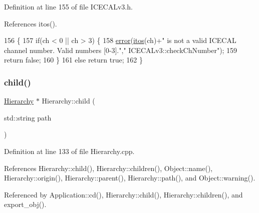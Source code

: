 Definition at line 155 of file I\+C\+E\+C\+A\+Lv3.\+h.



References itos().


\begin{DoxyCode}
156     \{
157         \textcolor{keywordflow}{if}(ch < 0 || ch > 3) \{
158             \hyperlink{classObject_a204a95f57818c0f811933917a30eff45}{error}(\hyperlink{Tools_8h_af330027dbdafb9a30768b3613c553e60}{itos}(ch)+\textcolor{stringliteral}{" is not a valid ICECAL channel number. Valid numbers [0-3]."},\textcolor{stringliteral}{"
      ICECALv3::checkChNumber"});
159             \textcolor{keywordflow}{return} \textcolor{keyword}{false};
160         \}
161         \textcolor{keywordflow}{else} \textcolor{keywordflow}{return} \textcolor{keyword}{true};
162     \}
\end{DoxyCode}
\mbox{\label{classHierarchy_a1e207f973c694b538bf90107b4868817}} 
\subsubsection{\texorpdfstring{child()}{child()}}
{\footnotesize\ttfamily \hyperlink{classHierarchy}{Hierarchy} $\ast$ Hierarchy\+::child (\begin{DoxyParamCaption}\item[{std\+::string}]{path }\end{DoxyParamCaption})\hspace{0.3cm}{\ttfamily [inherited]}}



Definition at line 133 of file Hierarchy.\+cpp.



References Hierarchy\+::child(), Hierarchy\+::children(), Object\+::name(), Hierarchy\+::origin(), Hierarchy\+::parent(), Hierarchy\+::path(), and Object\+::warning().



Referenced by Application\+::cd(), Hierarchy\+::child(), Hierarchy\+::children(), and export\+\_\+obj().


